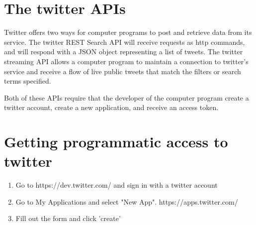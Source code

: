 \documentclass{article}\usepackage[]{graphicx}\usepackage[]{color}
\begin{document}
\section*{The twitter APIs}
Twitter offers two ways for computer programs to post and retrieve data from its service. The twitter REST Search API will receive requests as http commands, and will respond with a JSON object representing a list of tweets. The twitter streaming API allows a computer program to maintain a connection to twitter's service and receive a flow of live public tweets that match the filters or search terms specified.

Both of these APIs require that the developer of the computer program create a twitter account, create a new application, and receive an access token.

\section*{Getting programmatic access to twitter}
\begin{enumerate}
  \item Go to https://dev.twitter.com/ and sign in with a twitter account
  \item Go to My Applications and select "New App". https://apps.twitter.com/
  \item Fill out the form and click 'create'
\end{enumerate}
\end{document}
